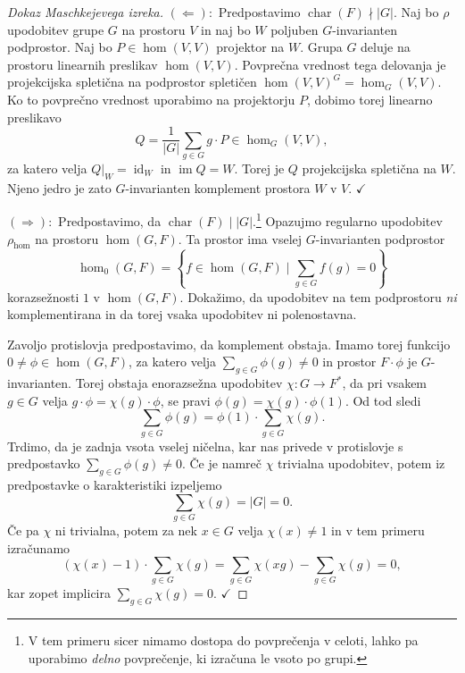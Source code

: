 \documentclass[11pt]{book}
\DeclareMathOperator\image{im}
\DeclareMathOperator\characteristic{char}
\DeclareMathOperator\id{id}
\def\kljuka{$\checkmark$}
\theoremstyle{definition}
\theoremstyle{zgled}
\theoremstyle{odprtproblem}
\theoremstyle{domacanaloga}
\newenvironment{dokaz}
    {\color{siva}\begin{proof}}
    {\end{proof}}
\theoremstyle{izrek}
\begin{document}
\begin{dokaz}[Dokaz Maschkejevega izreka]
$(\Leftarrow):$ Predpostavimo $\characteristic(F) \nmid |G|$. Naj bo $\rho$ upodobitev grupe $G$ na prostoru $V$ in naj bo $W$ poljuben $G$-invarianten podprostor. Naj bo $P \in \hom(V,V)$ projektor na $W$. Grupa $G$ deluje na prostoru linearnih preslikav $\hom(V,V)$. Povprečna vrednost tega delovanja je projekcijska spletična na podprostor spletičen $\hom(V,V)^G = \hom_G(V,V)$. Ko to povprečno vrednost uporabimo na projektorju $P$, dobimo torej linearno preslikavo
\[
    Q = \frac{1}{|G|} \sum_{g \in G} g \cdot P \in \hom_G(V,V),
\]
za katero velja $Q|_W = \id_W$ in $\image Q = W$. Torej je $Q$ projekcijska spletična na $W$. Njeno jedro je zato $G$-invarianten komplement prostora $W$ v $V$. \kljuka

$(\Rightarrow):$ Predpostavimo, da $\characteristic(F) \mid |G|$.\footnote{V tem primeru sicer nimamo dostopa do povprečenja v celoti, lahko pa uporabimo \emph{delno} povprečenje, ki izračuna le vsoto po grupi.} Opazujmo regularno upodobitev $\rho_{\hom}$ na prostoru $\hom(G,F)$. Ta prostor ima vselej $G$-invarianten podprostor
\[
    \textstyle \hom_0(G,F) = \left\{ f \in \hom(G,F) \mid \sum_{g \in G} f(g) = 0 \right\}
\]
korazsežnosti $1$ v $\hom(G,F)$. Dokažimo, da upodobitev na tem podprostoru \emph{ni} komplementirana in da torej vsaka upodobitev ni polenostavna. 

Zavoljo protislovja predpostavimo, da komplement obstaja. Imamo torej funkcijo $0 \neq \phi \in \hom(G,F)$, za katero velja $\sum_{g \in G} \phi(g) \neq 0$ in prostor $F \cdot \phi$ je $G$-invarianten. Torej obstaja enorazsežna upodobitev $\chi \colon G \to F^*$, da pri vsakem $g \in G$ velja $g \cdot \phi = \chi(g) \cdot \phi$, se pravi $\phi(g) = \chi(g) \cdot \phi(1)$. Od tod sledi 
\[
    \sum_{g \in G} \phi(g) = \phi(1) \cdot \sum_{g \in G} \chi(g).
\]
Trdimo, da je zadnja vsota vselej ničelna, kar nas privede v protislovje s predpostavko $\sum_{g \in G} \phi(g) \neq 0$. Če je namreč $\chi$ trivialna upodobitev, potem iz predpostavke o karakteristiki izpeljemo
\[
    \sum_{g \in G} \chi(g) = |G| = 0.
\]
Če pa $\chi$ ni trivialna, potem za nek $x \in G$ velja $\chi(x) \neq 1$ in v tem primeru izračunamo
\[
    (\chi(x) - 1) \cdot \sum_{g \in G} \chi(g) = \sum_{g \in G} \chi(xg) - \sum_{g \in G} \chi(g) = 0,
\]
kar zopet implicira $\sum_{g \in G} \chi(g) = 0$. \kljuka
\end{dokaz}
\end{document}
